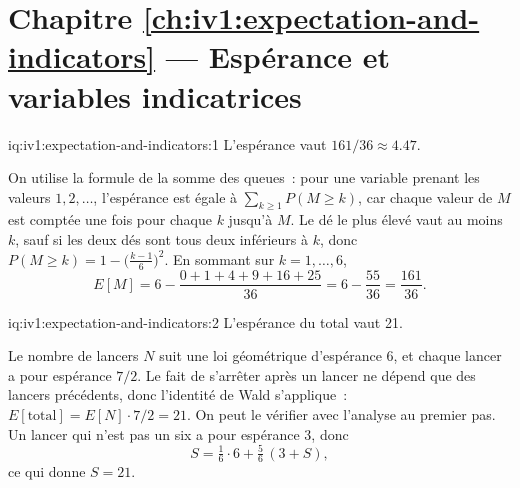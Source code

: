 \section*{Chapitre \ref{ch:iv1:expectation-and-indicators} --- Espérance et variables indicatrices}

\enlargethispage{-4\baselineskip}%
\begin{solution}{iq:iv1:expectation-and-indicators:1}
L'espérance vaut $161/36 \approx 4.47$.

On utilise la formule de la somme des queues~: pour une variable prenant les valeurs $1, 2, \dots$, l'espérance est égale à
$\sum_{k \ge 1} P(M \ge k)$, car chaque valeur de $M$ est comptée une fois pour chaque $k$ jusqu'à $M$. Le dé le plus élevé vaut au
moins $k$, sauf si les deux dés sont tous deux inférieurs à $k$, donc $P(M \ge k) = 1 - \bigl(\tfrac{k-1}{6}\bigr)^2$. En sommant sur
$k = 1, \dots, 6$,
\[
E[M] = 6 - \frac{0 + 1 + 4 + 9 + 16 + 25}{36} = 6 - \frac{55}{36} = \frac{161}{36}.
\]
\end{solution}

\begin{solution}{iq:iv1:expectation-and-indicators:2}
L'espérance du total vaut 21.

Le nombre de lancers $N$ suit une loi géométrique d'espérance 6, et chaque lancer a pour espérance $7/2$. Le fait de s'arrêter après un lancer
ne dépend que des lancers précédents, donc l'identité de Wald s'applique~: $E[\text{total}] = E[N] \cdot
7/2 = 21$. On peut le vérifier avec l'analyse au premier pas. Un lancer qui n'est pas un six a pour espérance 3, donc
\[
S = \tfrac16 \cdot 6 + \tfrac56 \,(3 + S),
\]
ce qui donne $S = 21$.

\end{solution}

